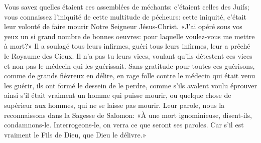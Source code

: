 Vous savez quelles étaient ces assemblées de méchants:
	c’étaient celles des Juifs;
	vous connaissez l’iniquité de cette multitude de pécheurs:
	cette iniquité,
		c’était leur volonté de faire mourir Notre Seigneur Jésus-Christ.
«J’ai opéré sous vos yeux un si grand nombre de bonnes oeuvres:
	pour laquelle voulez-vous me mettre à mort?»
Il a soulagé tous leurs infirmes, guéri tous leurs infirmes,
	leur a prêché le Royaume des Cieux.
Il n’a pas tu leurs vices, voulant qu’ils détestent ces vices
	et non pas le médecin qui les guérissait.
Sans gratitude pour toutes ces guérisons, comme de grands fiévreux en délire,
	en rage folle contre le médecin qui était venu les guérir,
	ils ont formé le dessein de le perdre,
	comme s’ils avalent voulu éprouver ainsi
		s’il était vraiment un homme qui puisse mourir,
	ou quelque chose de supérieur aux hommes, qui ne se laisse pas mourir.
Leur parole, nous la reconnaissons dans la Sagesse de Salomon:
	«À une mort ignominieuse, disent-ils, condamnons-le.
	Interrogeons-le, on verra ce que seront ses paroles.
	Car s'il est vraiment le Fils de Dieu, que Dieu le délivre.»
